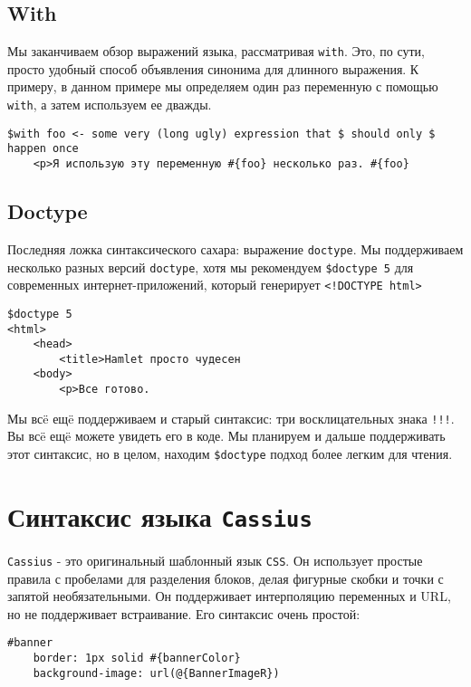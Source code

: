 \subsection{With}

Мы заканчиваем обзор выражений языка, рассматривая \texttt{with}. Это, по сути,
просто удобный способ объявления синонима для длинного выражения. К примеру,
в данном примере мы определяем один раз переменную с помощью \texttt{with}, а затем
используем ее дважды.

\begin{lstlisting}
$with foo <- some very (long ugly) expression that $ should only $ happen once
    <p>Я использую эту переменную #{foo} несколько раз. #{foo}
\end{lstlisting}

\subsection{Doctype}
Последняя ложка синтаксического сахара: выражение \texttt{doctype}. Мы
поддерживаем несколько разных версий \texttt{doctype}, хотя мы рекомендуем
\lstinline!$doctype 5! для современных интернет-приложений, который генерирует
\lstinline'<!DOCTYPE html>'

\begin{lstlisting}
$doctype 5
<html>
    <head>
        <title>Hamlet просто чудесен
    <body>
        <p>Все готово.
\end{lstlisting}

\begin{remark}
Мы всë ещë поддерживаем и старый синтаксис: три восклицательных знака \texttt{!!!}.
Вы всë ещë можете увидеть его в коде. Мы планируем и дальше поддерживать этот
синтаксис, но в целом, находим \lstinline!$doctype! подход более легким для чтения.
\end{remark}

\section{Синтаксис языка \texttt{Cassius}}
\texttt{Cassius} - это оригинальный шаблонный язык \texttt{CSS}. Он использует простые правила
с пробелами для разделения блоков, делая фигурные скобки и точки с запятой
необязательными. Он поддерживает интерполяцию переменных и URL, но не поддерживает
встраивание. Его синтаксис очень простой:

\begin{lstlisting}
#banner
    border: 1px solid #{bannerColor}
    background-image: url(@{BannerImageR})
\end{lstlisting}

